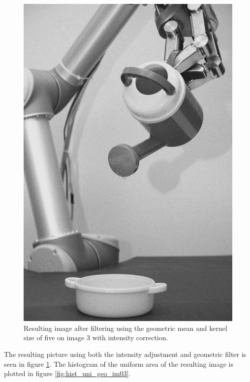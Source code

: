 \begin{figure}[H]
\centering
\includegraphics[width= 0.9 \linewidth]{../code/images/image_geometrical_03}
\caption{Resulting image after filtering using the geometric mean and kernel size of five on image 3 with intensity correction.}
\label{fig:img_result_im03}
\end{figure}


The resulting picture using both the intensity adjustment and geometric filter is seen in figure \ref{fig:img_result_im03}.
The histogram of the uniform area of the resulting image is plotted in figure  \ref{fig:hist_uni_geo_im03}.


